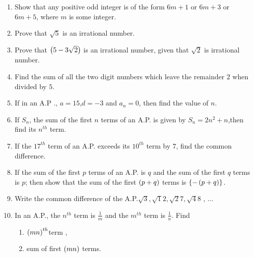 \begin{enumerate}
\item Show that any positive odd integer is of the form $6m + 1$ or $6m + 3$ or $6m + 5$, where $m$ is some integer.

\item Prove that ${\sqrt 5}$ is an irrational number.

\item Prove that $\left(5 - 3{\sqrt 2}\right)$ is an irrational number, given that ${\sqrt2}$ is irrational number.

\item Find the sum of all the two digit numbers which leave the remainder $2$ when divided by $5$.

\item If in an A.P ., $a=15$,$d=-3$ and $a_n=0$, then find the value of $n$.

\item If ${S_n}$, the sum of the first ${n}$ terms of an A.P. is given by ${S_n = 2n^2 + n}$,then find its $n^{th}$ term. 

\item If the $17^{th}$ term of an A.P. exceeds its $10^{th}$ term by $7$, find the common difference.

\item If the sum of the first $p$ terms of an A.P. is $q$ and the sum of the first $q$ terms is $p$; then show that the sum of the first $\left(p + q\right)$ terms is $\left\{-\left(p + q\right)\right\}$.

\item Write the common difference of the A.P.${\sqrt3} , {\sqrt12} , {\sqrt27} , {\sqrt48}$ , ... 

\item In an A.P., the $n^{th}$ term is ${\frac{1}{m}}$ and the $m^{th}$ term is $\frac{1}{n}$. Find 
\begin{enumerate}
     \item  $\left(mn\right)^{th}$term  ,
     \item sum of first $\left(mn\right)$ terms.
\end{enumerate}


\end{enumerate}

